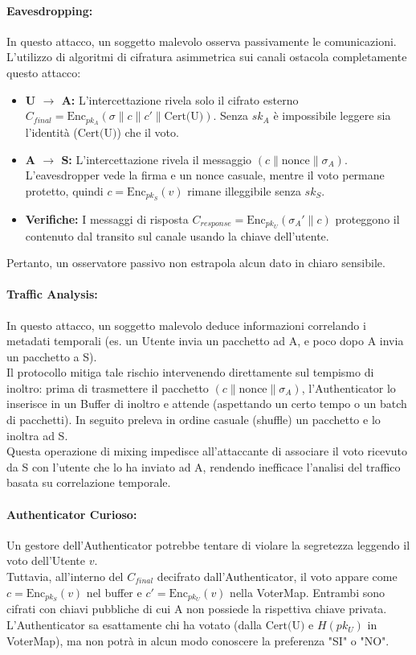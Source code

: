 \paragraph{Eavesdropping:}
In questo attacco, un soggetto malevolo osserva passivamente le comunicazioni. \\
L'utilizzo di algoritmi di cifratura asimmetrica sui canali ostacola completamente questo attacco:
\begin{itemize}
    \item \textbf{U $\rightarrow$ A:} L'intercettazione rivela solo il cifrato esterno $C_{final} = \text{Enc}_{pk_A}(\sigma \| c \| c' \| \text{Cert(U)})$. Senza $sk_A$ è impossibile leggere sia l'identità ($\text{Cert(U)}$) che il voto.
    \item \textbf{A $\rightarrow$ S:} L'intercettazione rivela il messaggio $(c \| \text{nonce} \| \sigma_A)$. L'eavesdropper vede la firma e un nonce casuale, mentre il voto permane protetto, quindi $c = \text{Enc}_{pk_S}(v)$ rimane illeggibile senza $sk_S$.
    \item \textbf{Verifiche:} I messaggi di risposta $C_{response} = \text{Enc}_{pk_U}(\sigma_A' \| c)$ proteggono il contenuto dal transito sul canale usando la chiave dell'utente.
\end{itemize}
Pertanto, un osservatore passivo non estrapola alcun dato in chiaro sensibile.

\paragraph{Traffic Analysis:}
In questo attacco, un soggetto malevolo deduce informazioni correlando i metadati temporali (es. un Utente invia un pacchetto ad A, e poco dopo A invia un pacchetto a S). \\
Il protocollo mitiga tale rischio intervenendo direttamente sul tempismo di inoltro: prima di trasmettere il pacchetto $(c \| \text{nonce} \| \sigma_A)$, l'Authenticator lo inserisce in un Buffer di inoltro e attende (aspettando un certo tempo o un batch di pacchetti). In seguito preleva in ordine casuale (shuffle) un pacchetto e lo inoltra ad S. \\
Questa operazione di mixing impedisce all'attaccante di associare il voto ricevuto da S con l'utente che lo ha inviato ad A, rendendo inefficace l'analisi del traffico basata su correlazione temporale.

\paragraph{Authenticator Curioso:}
Un gestore dell'Authenticator potrebbe tentare di violare la segretezza leggendo il voto dell'Utente $v$. \\
Tuttavia, all'interno del $C_{final}$ decifrato dall'Authenticator, il voto appare come $c = \text{Enc}_{pk_S}(v)$ nel buffer e $c' = \text{Enc}_{pk_U}(v)$ nella VoterMap. Entrambi sono cifrati con chiavi pubbliche di cui A non possiede la rispettiva chiave privata. L'Authenticator sa esattamente chi ha votato (dalla $\text{Cert(U)}$ e $H(pk_U)$ in VoterMap), ma non potrà in alcun modo conoscere la preferenza "SI" o "NO".

